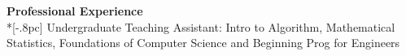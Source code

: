 
{\large \bf Professional Experience} \\*[-.8pc]
\underline{\hspace{6in}} 
Undergraduate Teaching Assistant:  Intro to Algorithm, Mathematical Statistics, Foundations of Computer Science and Beginning Prog for Engineers \\





